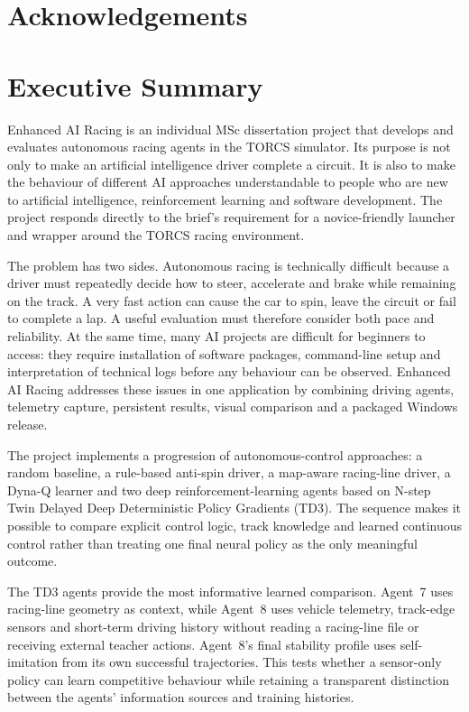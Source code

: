 \section*{Acknowledgements}

\section*{Executive Summary}

Enhanced AI Racing is an individual MSc dissertation project that develops and evaluates autonomous racing agents in the TORCS simulator. Its purpose is not only to make an artificial intelligence driver complete a circuit. It is also to make the behaviour of different AI approaches understandable to people who are new to artificial intelligence, reinforcement learning and software development. The project responds directly to the brief's requirement for a novice-friendly launcher and wrapper around the TORCS racing environment.

The problem has two sides. Autonomous racing is technically difficult because a driver must repeatedly decide how to steer, accelerate and brake while remaining on the track. A very fast action can cause the car to spin, leave the circuit or fail to complete a lap. A useful evaluation must therefore consider both pace and reliability. At the same time, many AI projects are difficult for beginners to access: they require installation of software packages, command-line setup and interpretation of technical logs before any behaviour can be observed. Enhanced AI Racing addresses these issues in one application by combining driving agents, telemetry capture, persistent results, visual comparison and a packaged Windows release.

The project implements a progression of autonomous-control approaches: a random baseline, a rule-based anti-spin driver, a map-aware racing-line driver, a Dyna-Q learner and two deep reinforcement-learning agents based on N-step Twin Delayed Deep Deterministic Policy Gradients (TD3). The sequence makes it possible to compare explicit control logic, track knowledge and learned continuous control rather than treating one final neural policy as the only meaningful outcome.

The TD3 agents provide the most informative learned comparison. Agent~7 uses racing-line geometry as context, while Agent~8 uses vehicle telemetry, track-edge sensors and short-term driving history without reading a racing-line file or receiving external teacher actions. Agent~8's final stability profile uses self-imitation from its own successful trajectories. This tests whether a sensor-only policy can learn competitive behaviour while retaining a transparent distinction between the agents' information sources and training histories.

